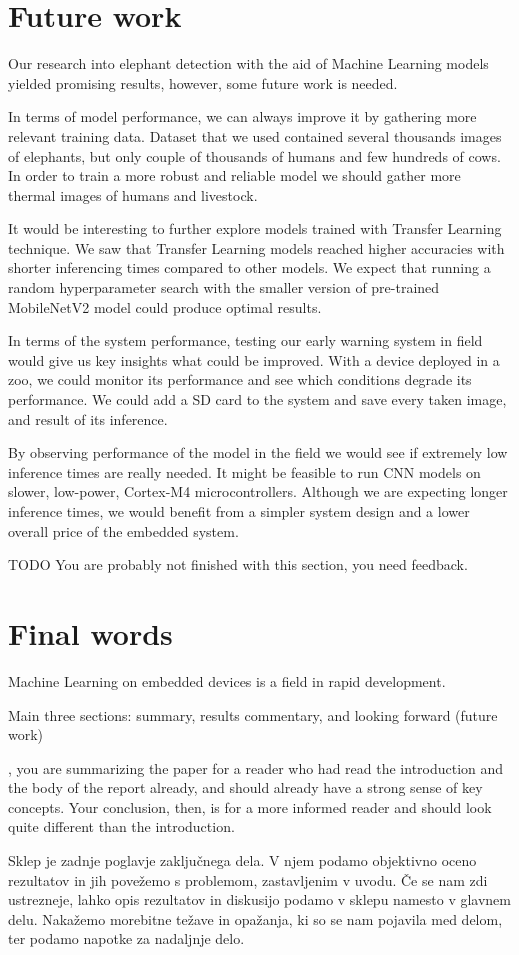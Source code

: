 


\section{Future work}

Our research into elephant detection with the aid of Machine Learning models yielded promising results, however, some future work is needed.

In terms of model performance, we can always improve it by gathering more relevant training data.
Dataset that we used contained several thousands images of elephants, but only couple of thousands of humans and few hundreds of cows.
In order to train a more robust and reliable model we should gather more thermal images of humans and livestock.

It would be interesting to further explore models trained with Transfer Learning technique.
We saw that Transfer Learning models reached higher accuracies with shorter inferencing times compared to other models.
We expect that running a random hyperparameter search with the smaller version of pre-trained MobileNetV2 model could produce optimal results.

In terms of the system performance, testing our early warning system in field would give us key insights what could be improved.
With a device deployed in a zoo, we could monitor its performance and see which conditions degrade its performance.
We could add a SD card to the system and save every taken image, and result of its inference.

By observing performance of the model in the field we would see if extremely low inference times are really needed.
It might be feasible to run CNN models on slower, low-power, Cortex-M4 microcontrollers.
Although we are expecting longer inference times, we would benefit from a simpler system design and a lower overall price of the embedded system.

TODO You are probably not finished with this section, you need feedback.

\section{Final words}

Machine Learning on embedded devices is a field in rapid development.






Main three sections: summary, results commentary, and looking forward (future work)

, you are summarizing the paper for a reader who had read the introduction and the body of the report already, and should already have a strong sense of key concepts. Your conclusion, then, is for a more informed reader and should look quite different than the introduction.



Sklep je zadnje poglavje zaključnega dela. V njem podamo objektivno oceno rezultatov in
jih povežemo s problemom, zastavljenim v uvodu. Če se nam zdi ustrezneje, lahko opis
rezultatov in diskusijo podamo v sklepu namesto v glavnem delu. Nakažemo morebitne
težave in opažanja, ki so se nam pojavila med delom, ter podamo napotke za nadaljnje
delo.
